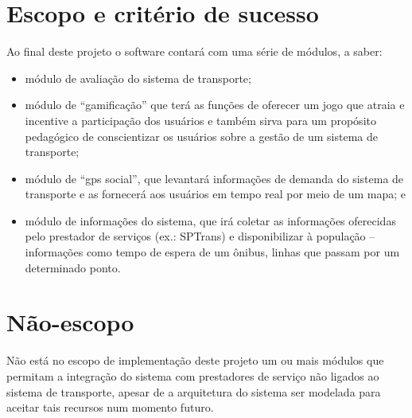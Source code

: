 \section{Escopo e critério de sucesso}\label{sec:Escopo}
	Ao final deste projeto o software contará com uma série de módulos, a saber:
	\begin{itemize}%
		\item módulo de avaliação do sistema de transporte;
		\item módulo de “gamificação” que terá as funções de oferecer um jogo que atraia e incentive a participação dos usuários e também sirva para um propósito pedagógico de conscientizar os usuários sobre a gestão de um sistema de transporte;
		\item módulo de “gps social”, que levantará informações de demanda do sistema de transporte e as fornecerá aos usuários em tempo real por meio de um mapa; e
		\item módulo de informações do sistema, que irá coletar as informações oferecidas pelo prestador de serviços (ex.: SPTrans) e disponibilizar à população – informações como tempo de espera de um ônibus, linhas que passam por um determinado ponto.
	\end{itemize}

\section{Não-escopo}\label{sec:NãoEscopo}
	Não está no escopo de implementação deste projeto um ou mais módulos que permitam a integração do sistema com prestadores de serviço não ligados ao sistema de transporte, apesar de a arquitetura do sistema ser modelada para aceitar tais recursos num momento futuro.

